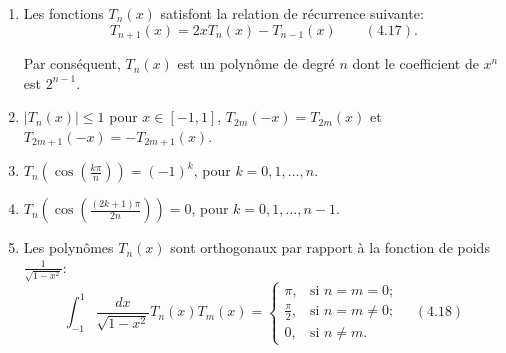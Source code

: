 \begin{theoreme}[Propriétés]
	\begin{enumerate}
		\item Les fonctions $T_n(x)$ satisfont la relation de récurrence suivante: $$ T_{n+1}(x) = 2xT_n(x) - T_{n-1}(x) \quad\quad (4.17).$$ 
		
		Par conséquent, $T_n(x)$ est un polynôme de degré $n$ dont le coefficient de $x^n$ est $2^{n-1}$.
		
		\item $|T_n(x)| \leq 1$ pour $x \in [-1,1]$, $T_{2m}(-x) = T_{2m}(x)$ et $T_{2m+1}(-x) = -T_{2m+1}(x)$.
		
		\item $T_n(\cos(\frac{k\pi}{n})) = (-1)^k$, pour $k = 0,1,\ldots,n$.
		
		\item $T_n(\cos(\frac{(2k+1)\pi}{2n})) = 0$, pour $k = 0,1,\ldots,n-1$.
		
		\item Les polynômes $T_n(x)$ sont orthogonaux par rapport à la fonction de poids $\frac{1}{\sqrt{1-x^2}}$:
		\[
		\displaystyle\int_{-1}^{1} \frac{dx}{\sqrt{1-x^2}} T_n(x)T_m(x) = 
		\left\lbrace \begin{array}{ll}
		\pi, & \text{si } n = m = 0; \\
		\frac{\pi}{2}, & \text{si } n = m \neq 0; \\
		0, & \text{si } n \neq m.
		\end{array} \quad (4.18)\right. 
		\]
	\end{enumerate}
\end{theoreme}

